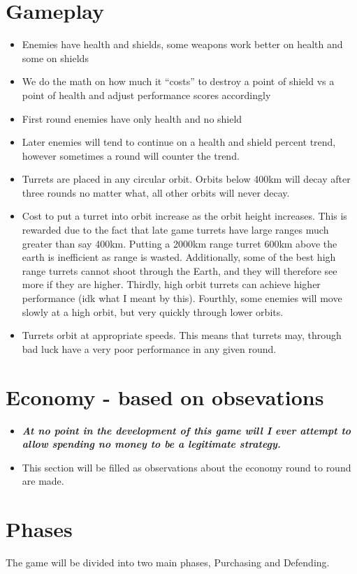 \documentclass[12pt]{article}
\begin{document}
\section*{Gameplay}
\begin{itemize}
\item Enemies have health and shields, some weapons work better on health and
some on shields
\item We do the math on how much it ``costs'' to destroy a point of shield vs
a point of health and adjust performance scores accordingly
\item First round enemies have only health and no shield
\item Later enemies will tend to continue on a health and shield percent trend,
however sometimes a round will counter the trend.
\item Turrets are placed in any circular orbit. Orbits below 400km will decay
after three rounds no matter what, all other orbits will never decay.
\item Cost to put a turret into orbit increase as the orbit height increases.
This is rewarded due to the fact that late game turrets have large ranges much
greater than say 400km. Putting a 2000km range turret 600km above the earth is
inefficient as range is wasted. Additionally, some of the best high range
turrets cannot shoot through the Earth, and they will therefore see more if
they are higher. Thirdly, high orbit turrets can achieve higher performance
(idk what I meant by this). Fourthly, some enemies will move slowly at a high
orbit, but very quickly through lower orbits.
\item Turrets orbit at appropriate speeds. This means that turrets may,
through bad luck have a very poor performance in any given round.
\end{itemize}

\section*{Economy - based on obsevations}
\begin{itemize}
\item \textbf{\textit{At no point in the development of this game will I ever
attempt to allow spending no money to be a legitimate strategy.}}
\item This section will be filled as observations about the economy round to
round are made.
\end{itemize}


\section*{Phases}
The game will be divided into two main phases, Purchasing and Defending.
\end{document}
